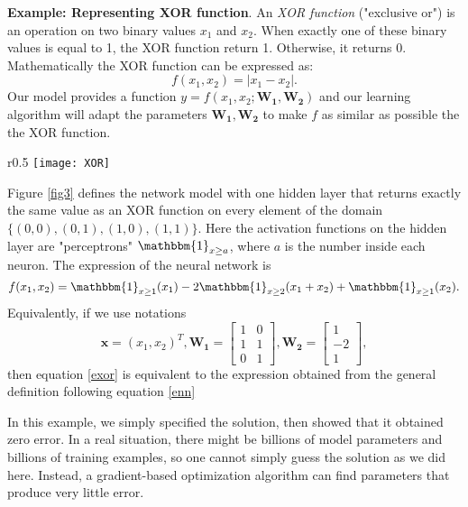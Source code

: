 {\bf Example: Representing XOR function}.
An \textit{XOR function} ("exclusive or") is an operation on two binary values $x_1$ and $x_2$. When exactly one of these binary values is equal to 1, the XOR function return 1. Otherwise, it returns 0. Mathematically the XOR function can be expressed as:
\begin{equation}
    f(x_1, x_2) = |x_1 - x_2|.
\end{equation}
Our model provides a function $y = f(x_1, x_2;\bm{W_1}, \bm{W_2})$ and our learning algorithm will adapt the parameters $\bm{W_1}, \bm{W_2}$ to make $f$ as similar as possible the the XOR function.
\begin{wrapfigure}{r}{0.5\textwidth}
\centering
\texttt{[image: XOR]}
\caption{Representing XOR Function}
\label{fig3}
\end{wrapfigure}
Figure \ref{fig3} defines the network model with one hidden layer that returns exactly the same value as an XOR function on every element of the domain $\{(0,0), (0,1), (1,0), (1,1)\}$. Here the activation functions on the hidden layer are "perceptrons" $\mathbbm{1}_{x\ge a}$, where $a$ is the number inside each neuron. The expression of the neural network is
\begin{equation}
  f(x_1,x_2) = \mathbbm{1}_{x\ge 1}(x_1) -2\mathbbm{1}_{x\ge 2}(x_1+x_2) + \mathbbm{1}_{x\ge 1}(x_2).
\end{equation}
Equivalently, if we use notations 
\begin{equation}\label{exor}
    \bm x = (x_1, x_2)^T, 
    \bm{W_1} = \left[
    \begin{array}{cc}
        1 & 0 \\
        1 & 1 \\
        0 & 1 
    \end{array}
    \right],
    \bm{W_2} = \left[
    \begin{array}{c}
        1  \\
        -2 \\
        1 
    \end{array}
    \right],
\end{equation}
then equation \eqref{exor} is equivalent to the expression obtained from the general definition following equation \eqref{enn}

In this example, we simply specified the solution, then showed that it obtained zero error. In a real situation, there might be billions of model parameters and billions of training examples, so one cannot simply guess the solution as we did here. Instead, a gradient-based optimization algorithm can find parameters that produce very little error.

